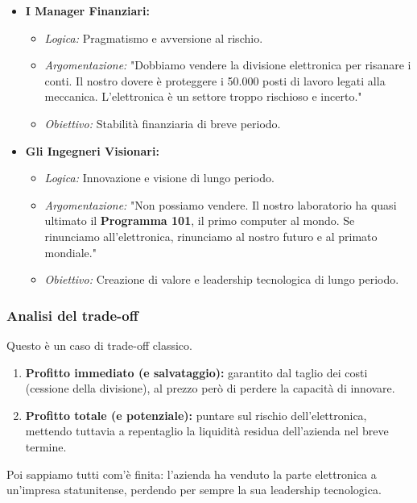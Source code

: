 \documentclass[a4paper,12pt]{article}
\begin{document}
	\begin{itemize}
		\item \textbf{I Manager Finanziari:}
		\begin{itemize}
			\item \textit{Logica:} Pragmatismo e avversione al rischio.
			\item \textit{Argomentazione:} "Dobbiamo vendere la divisione elettronica per risanare i conti. Il nostro dovere è proteggere i 50.000 posti di lavoro legati alla meccanica. L'elettronica è un settore troppo rischioso e incerto."
			\item \textit{Obiettivo:} Stabilità finanziaria di breve periodo.
		\end{itemize}
		
		\item \textbf{Gli Ingegneri Visionari:}
		\begin{itemize}
			\item \textit{Logica:} Innovazione e visione di lungo periodo.
			\item \textit{Argomentazione:} "Non possiamo vendere. Il nostro laboratorio ha quasi ultimato il \textbf{Programma 101}, il primo computer al mondo. Se rinunciamo all'elettronica, rinunciamo al nostro futuro e al primato mondiale."
			\item \textit{Obiettivo:} Creazione di valore e leadership tecnologica di lungo periodo.
		\end{itemize}
	\end{itemize}
	
	\subsubsection{Analisi del trade-off}
	
	Questo è un caso di trade-off classico.%
	\begin{enumerate}
		\item \textbf{Profitto immediato (e salvataggio):} garantito dal taglio dei costi (cessione della divisione), al prezzo però di perdere la capacità di innovare.
		\item \textbf{Profitto totale (e potenziale):} puntare sul rischio dell'elettronica, mettendo tuttavia a repentaglio la liquidità residua dell'azienda nel breve termine.
	\end{enumerate}
	
	Poi sappiamo tutti com'è finita: l'azienda ha venduto la parte elettronica a un'impresa statunitense, perdendo per sempre la sua leadership tecnologica.
	
\end{document}
